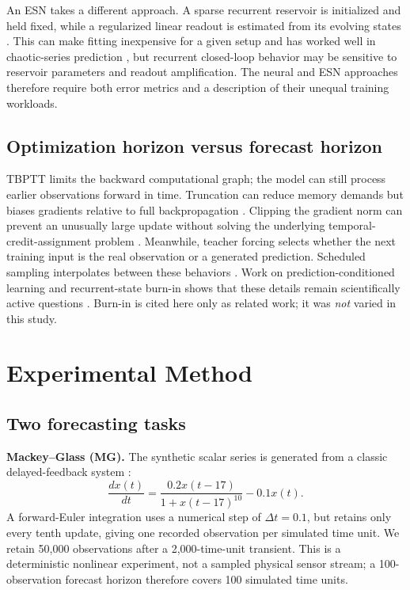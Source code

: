 \documentclass[final,5p,times,twocolumn]{elsarticle}
\begin{document}
An ESN takes a different approach. A sparse recurrent reservoir is initialized and held fixed, while a regularized linear readout is estimated from its evolving states \cite{lukosevicius2012practical}. This can make fitting inexpensive for a given setup and has worked well in chaotic-series prediction \cite{shahi2022prediction}, but recurrent closed-loop behavior may be sensitive to reservoir parameters and readout amplification. The neural and ESN approaches therefore require both error metrics and a description of their unequal training workloads.

\subsection{Optimization horizon versus forecast horizon}
TBPTT limits the backward computational graph; the model can still process earlier observations forward in time. Truncation can reduce memory demands but biases gradients relative to full backpropagation \cite{aicher2020adaptively}. Clipping the gradient norm can prevent an unusually large update without solving the underlying temporal-credit-assignment problem \cite{pascanu2013difficulty}. Meanwhile, teacher forcing selects whether the next training input is the real observation or a generated prediction. Scheduled sampling interpolates between these behaviors \cite{bengio2015scheduled}. Work on prediction-conditioned learning and recurrent-state burn-in shows that these details remain scientifically active questions \cite{vlachas2024learning,schiller2026burnin}. Burn-in is cited here only as related work; it was \emph{not} varied in this study.

\section{Experimental Method}

\subsection{Two forecasting tasks}
\textbf{Mackey--Glass (MG).} The synthetic scalar series is generated from a classic delayed-feedback system \cite{mackey1977oscillation}:
\begin{equation}
 \frac{dx(t)}{dt}=\frac{0.2x(t-17)}{1+x(t-17)^{10}}-0.1x(t).
 \label{eq:mg}
\end{equation}
A forward-Euler integration uses a numerical step of $\Delta t=0.1$, but retains only every tenth update, giving one recorded observation per simulated time unit. We retain 50,000 observations after a 2,000-time-unit transient. This is a deterministic nonlinear experiment, not a sampled physical sensor stream; a 100-observation forecast horizon therefore covers 100 simulated time units.
\end{document}
